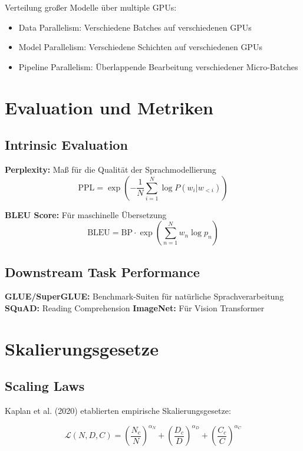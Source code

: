 Verteilung großer Modelle über multiple GPUs:
\begin{itemize}
    \item Data Parallelism: Verschiedene Batches auf verschiedenen GPUs
    \item Model Parallelism: Verschiedene Schichten auf verschiedenen GPUs
    \item Pipeline Parallelism: Überlappende Bearbeitung verschiedener Micro-Batches
\end{itemize}

\section{Evaluation und Metriken}

\subsection{Intrinsic Evaluation}

\textbf{Perplexity:} Maß für die Qualität der Sprachmodellierung
\begin{equation}
\text{PPL} = \exp\left(-\frac{1}{N}\sum_{i=1}^{N} \log P(w_i | w_{<i})\right)
\end{equation}

\textbf{BLEU Score:} Für maschinelle Übersetzung
\begin{equation}
\text{BLEU} = \text{BP} \cdot \exp\left(\sum_{n=1}^{N} w_n \log p_n\right)
\end{equation}

\subsection{Downstream Task Performance}

\textbf{GLUE/SuperGLUE:} Benchmark-Suiten für natürliche Sprachverarbeitung
\textbf{SQuAD:} Reading Comprehension
\textbf{ImageNet:} Für Vision Transformer

\section{Skalierungsgesetze}

\subsection{Scaling Laws}

Kaplan et al. (2020) etablierten empirische Skalierungsgesetze:

\begin{equation}
\mathcal{L}(N, D, C) = \left(\frac{N_c}{N}\right)^{\alpha_N} + \left(\frac{D_c}{D}\right)^{\alpha_D} + \left(\frac{C_c}{C}\right)^{\alpha_C}
\end{equation}


